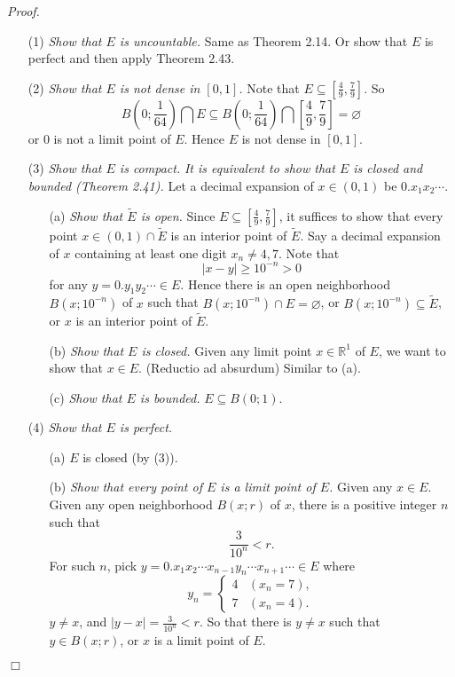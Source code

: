 \documentclass{article}
\begin{document}
\emph{Proof.}
\begin{enumerate}
\item[(1)]
\emph{Show that $E$ is uncountable.}
Same as Theorem 2.14.
Or show that $E$ is perfect and then apply Theorem 2.43.
\item[(2)]
\emph{Show that $E$ is not dense in $[0,1]$.}
Note that $E \subseteq \left[\frac{4}{9}, \frac{7}{9}\right]$.
So $$B\left(0;\frac{1}{64}\right) \bigcap E
\subseteq B\left(0;\frac{1}{64}\right) \bigcap \left[\frac{4}{9}, \frac{7}{9}\right]
= \varnothing$$ or $0$ is not a limit point of $E$.
Hence $E$ is not dense in $[0,1]$.
\item[(3)]
\emph{Show that $E$ is compact.}
\emph{It is equivalent to show that $E$ is closed and bounded (Theorem 2.41).}
  Let a decimal expansion of $x \in (0,1)$ be $0.x_1 x_2 \cdots$.
  \begin{enumerate}
  \item[(a)]
  \emph{Show that $\widetilde{E}$ is open.}
  Since $E \subseteq \left[\frac{4}{9}, \frac{7}{9}\right]$,
  it suffices to show that every point $x \in (0,1) \cap \widetilde{E}$ is
  an interior point of $\widetilde{E}$.
  Say a decimal expansion of $x$ containing at least one digit $x_n \neq 4, 7$.
  Note that
  $$|x-y| \geq 10^{-n} > 0$$
  for any $y = 0.y_1y_2 \cdots \in E$.
  Hence there is an open neighborhood $B(x;10^{-n})$ of $x$ such that
  $B(x;10^{-n}) \cap E = \varnothing$, or $B(x;10^{-n}) \subseteq \widetilde{E}$,
  or $x$ is an interior point of $\widetilde{E}$.
  \item[(b)]
  \emph{Show that $E$ is closed.}
  Given any limit point $x \in \mathbb{R}^1$ of $E$, we want to show that $x \in E$.
  (Reductio ad absurdum) Similar to (a).
  \item[(c)]
  \emph{Show that $E$ is bounded.}
  $E \subseteq B(0;1)$.
  \end{enumerate}
\item[(4)]
\emph{Show that $E$ is perfect.}
  \begin{enumerate}
  \item[(a)]
  $E$ is closed (by (3)).
  \item[(b)]
  \emph{Show that every point of $E$ is a limit point of $E$.}
  Given any $x \in E$.
  Given any open neighborhood $B(x;r)$ of $x$, there is a positive integer $n$
  such that $$\frac{3}{10^n} < r.$$
  For such $n$, pick $y = 0.x_1x_2 \cdots x_{n-1} y_n \cdots x_{n+1} \cdots \in E$
  where
  \begin{equation*}
  y_n =
    \begin{cases}
      4 & (x_n = 7), \\
      7 & (x_n = 4).
    \end{cases}
  \end{equation*}
  $y \neq x$, and $|y-x| = \frac{3}{10^{n}} < r$.
  So that there is $y \neq x$ such that $y \in B(x;r)$, or $x$ is a limit point of $E$.
  \end{enumerate}
\end{enumerate}
$\Box$ \\\\
\end{document}
